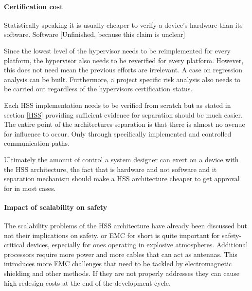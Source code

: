 \paragraph{Certification cost}
Statistically speaking it is usually cheaper to verify a device's hardware than its software. Software  [Unfinished, because this claim is unclear]

Since the lowest level of the hypervisor needs to be reimplemented for every platform, the hypervisor also needs to be reverified for every platform. However, this does not need mean the previous efforts are irrelevant. A case on regression analysis can be built.
Furthermore, a project specific risk analysis also needs to be carried out regardless of the hypervisors certification status.

Each \gls{HSS} implementation needs to be verified from scratch but as stated in section \ref{HSS} providing sufficient evidence for separation should be much easier. The entire point of the architectures separation is that there is almost no avenue for influence to occur. Only through specifically implemented and controlled communication paths.

Ultimately the amount of control a system designer can exert on a device with the \gls{HSS} architecture, the fact that is hardware and not software and it separation mechanism should make a \gls{HSS} architecture cheaper to get approval for in most cases.


\paragraph{Impact of scalability on safety}
The scalability problems of the \gls{HSS} architecture have already been discussed but not their implications on safety.  or \gls{EMC} for short is quite important for safety-critical devices, especially for ones operating in explosive atmospheres. Additional processors require more power and more cables that can act as antennas. This introduces more \gls{EMC} challenges that need to be tackled by electromagnetic shielding and other methods. If they are not properly addresses they can cause high redesign costs at the end of the development cycle.

